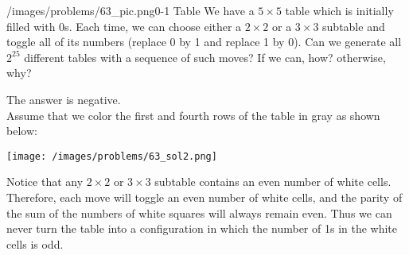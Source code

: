 \begin{problem}{/images/problems/63_pic.png}{0-1 Table} We have a $5 \times 5$ table which is initially filled with 0s. Each time, we can choose either a $2 \times 2$ or a $3 \times 3$ subtable and toggle all of its numbers (replace 0 by 1 and replace 1 by 0). Can we generate all $2^{25}$ different tables with a sequence of such moves? If we can, how? otherwise, why?
\end{problem}
\begin{solution}
The answer is negative.\\[0.2cm]
Assume that we color the first and fourth rows of the table in gray as shown below:

\begin{center}
	\texttt{[image: /images/problems/63\_sol2.png]}
\end{center}

Notice that any $2 \times 2$ or $3 \times 3$ subtable contains an even number of white cells. Therefore, each move will toggle an even number of white cells, and the parity of the sum of the numbers of white squares will always remain even. Thus we can never turn the table into a configuration in which the number of 1s in the white cells is odd.
\end{solution}

